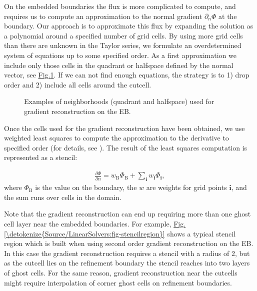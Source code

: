 \documentclass[letterpaper,10pt,english]{sphinxmanual}
\let\sphinxpxdimen\pdfpxdimen\else\newdimen\sphinxpxdimen
\begin{document}
On the embedded boundaries the flux is more complicated to compute, and requires us to compute an approximation to the normal gradient \(\partial_n\Phi\) at the boundary.
Our approach is to approximate this flux by expanding the solution as a polynomial around a specified number of grid cells.
By using more grid cells than there are unknown in the Taylor series, we formulate an over\sphinxhyphen{}determined system of equations up to some specified order.
As a first approximation we include only those cells in the quadrant or half\sphinxhyphen{}space defined by the normal vector, see \hyperref[\detokenize{Source/LinearSolvers:fig-gradientreconstruction}]{Fig.\@ \ref{\detokenize{Source/LinearSolvers:fig-gradientreconstruction}}}.
If we can not find enough equations, the strategy is to 1) drop order and 2) include all cells around the cut\sphinxhyphen{}cell.

\begin{figure}[htb]
\centering
\capstart

\noindent\sphinxincludegraphics[width=360\sphinxpxdimen]{{GradientReconstruction}.png}
\caption{Examples of neighborhoods (quadrant and half\sphinxhyphen{}space) used for gradient reconstruction on the EB.}\label{\detokenize{Source/LinearSolvers:id2}}\label{\detokenize{Source/LinearSolvers:fig-gradientreconstruction}}\end{figure}

Once the cells used for the gradient reconstruction have been obtained, we use weighted least squares to compute the approximation to the derivative to specified order (for details, see {\hyperref[\detokenize{Utilities/LeastSquares:chap-leastsquares}]{}}).
The result of the least squares computation is represented as a stencil:

\label{\detokenize{Source/LinearSolvers:eq-dirichletelliptic}}\begin{equation*}
\begin{split}\frac{\partial\Phi}{\partial n} = w_{\textrm{B}}\Phi_{\textrm{B}} + \sum_{\mathbf{i}} w_{\mathbf{i}}\Phi_{\mathbf{i}},\end{split}
\end{equation*}
where \(\Phi_{\textrm{B}}\) is the value on the boundary, the \(w\) are weights for grid points \(\mathbf{i}\), and the sum runs over cells in the domain.

Note that the gradient reconstruction can end up requiring more than one ghost cell layer near the embedded boundaries.
For example, \hyperref[\detokenize{Source/LinearSolvers:fig-stencilregion}]{Fig.\@ \ref{\detokenize{Source/LinearSolvers:fig-stencilregion}}} shows a typical stencil region which is built when using second order gradient reconstruction on the EB.
In this case the gradient reconstruction requires a stencil with a radius of 2, but as the cut\sphinxhyphen{}cell lies on the refinement boundary the stencil reaches into two layers of ghost cells.
For the same reason, gradient reconstruction near the cut\sphinxhyphen{}cells might require interpolation of corner ghost cells on refinement boundaries.
\end{document}
